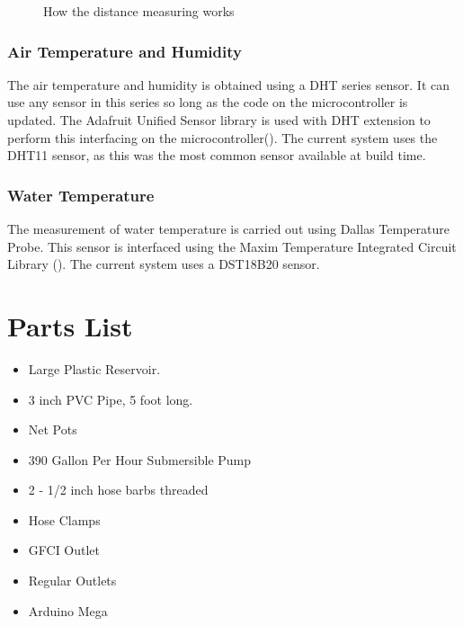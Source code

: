 \documentclass[american,12pt]{article}
\begin{document}
\begin{figure}[h]
    \centering
    \caption{How the distance measuring works}
    \label{fig:distance measuring}
\end{figure}

\subsubsection{Air Temperature and Humidity}
The air temperature and humidity is obtained using a DHT series sensor. It can
use any sensor in this series so long as the code on the microcontroller is
updated. The Adafruit Unified Sensor library is used with DHT extension to
perform this interfacing on the
microcontroller(\cite{adafruit-unified-sensor,adafruit-dht}). The current system
uses the DHT11 sensor, as this was the most common sensor available at build
time.

\subsubsection{Water Temperature}
The measurement of water temperature is carried out using Dallas Temperature
Probe. This sensor is interfaced using the Maxim Temperature Integrated Circuit
Library (\cite{gh-arduino-temperature}). The current system uses
a DST18B20 sensor.

\section{Parts List}
\begin{itemize}
    \item Large Plastic Reservoir.
    \item 3 inch PVC Pipe, 5 foot long.
    \item Net Pots
    \item 390 Gallon Per Hour Submersible Pump
    \item 2 - 1/2 inch hose barbs threaded
    \item Hose Clamps
    \item GFCI Outlet
    \item Regular Outlets
    \item Arduino Mega
\end{itemize}
\end{document}
